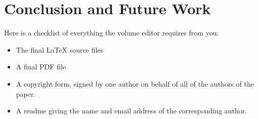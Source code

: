 \documentclass[runningheads,a4paper]{llncs}
\begin{document}
\section{Conclusion and Future Work}
Here is a checklist of everything the volume editor requires from you:


\begin{itemize}
\settowidth{\leftmargin}{{\Large$\square$}}\advance\leftmargin{}
\itemsep8pt\relax
\renewcommand\labelitemi{{\lower1.5pt\hbox{\Large$\square$}}}

\item The final \LaTeX{} source files
\item A final PDF file
\item A copyright form, signed by one author on behalf of all of the
authors of the paper.
\item A readme giving the name and email address of the
corresponding author.
\end{itemize}
\end{document}
